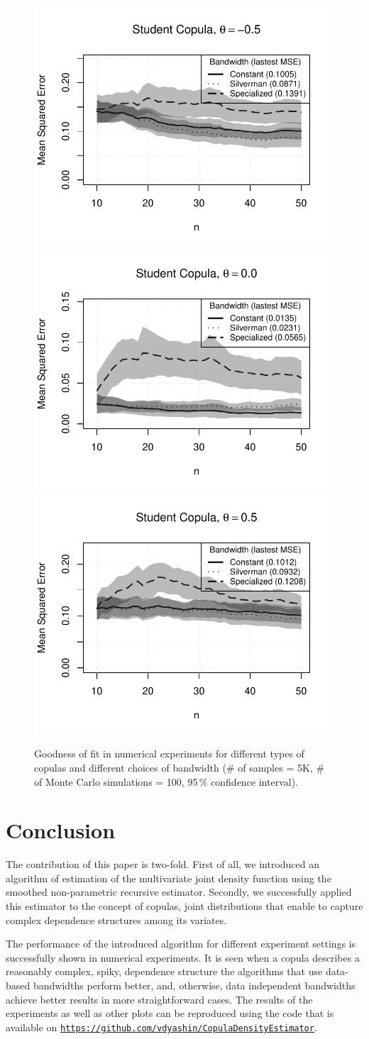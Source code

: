 \documentclass[12pt]{article}
\begin{document}
\begin{landscape}
\begin{figure}
			\includegraphics[width=0.31\linewidth]{plots/experiment_results/student_05}
			\includegraphics[width=0.31\linewidth]{plots/experiment_results/student0}
			\includegraphics[width=0.31\linewidth]{plots/experiment_results/student05}
			\caption{Goodness of fit in numerical experiments for different types of copulas and different choices of bandwidth (\# of samples = 5K, \# of Monte Carlo simulations = 100, 95\,\% confidence interval).}
			\label{fig:numerical_results}
		\end{figure}
	\end{landscape}
	
	\section{Conclusion}
	
	The contribution of this paper is two-fold. First of all, we introduced an algorithm of estimation of the multivariate joint density function using the smoothed non-parametric recursive estimator. Secondly, we successfully applied this estimator to the concept of copulas, joint distributions that enable to capture complex dependence structures among its variates. 
	
	The performance of the introduced algorithm for different experiment settings is successfully shown in numerical experiments. It is seen when a copula describes a reasonably complex, spiky, dependence structure the algorithms that use data-based bandwidths perform better, and, otherwise, data independent bandwidths achieve better results in more straightforward cases. The results of the experiments as well as other plots can be reproduced using the code that is available on \href{https://github.com/vdyashin/CopulaDensityEstimator}{\texttt{https://github.com/vdyashin/CopulaDensityEstimator}}.
	
\end{document}
